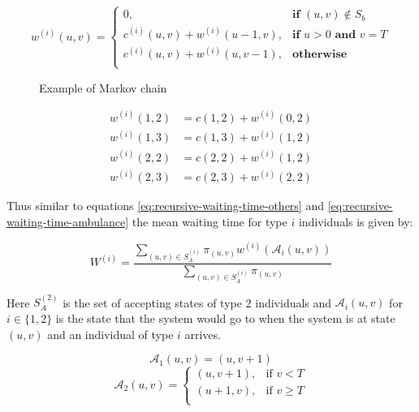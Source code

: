 \begin{equation}
    w^{(i)}(u,v) = 
    \begin{cases} 
        0, & \textbf{if } (u,v) \notin S_b \\
        c^{(i)}(u,v) + w^{(i)}(u - 1, v), & \textbf{if } u > 0 
        \textbf{ and } v = T\\
        c^{(i)}(u,v) + w^{(i)}(u, v-1), & \textbf{otherwise } \\
    \end{cases}
\end{equation}


\begin{multicols*}{2}
    \begin{figure}[H]
        \centering
        \scalebox{0.60}{}
        \caption{Example of Markov chain}
        \label{fig:example-algeb-waiting}
    \end{figure}
    \columnbreak
    \begin{align}
        w^{(i)}(1,2) &= c(1,2) + w^{(i)}(0,2) \label{eq:first_eq_of_waiting_example} \\
        w^{(i)}(1,3) &= c(1,3) + w^{(i)}(1,2) \\
        w^{(i)}(2,2) &= c(2,2) + w^{(i)}(1,2) \\
        w^{(i)}(2,3) &= c(2,3) + w^{(i)}(2,2) \label{eq:last_eq_of_waiting_example}
    \end{align}
\end{multicols*}



Thus similar to equations \ref{eq:recursive-waiting-time-others} and
\ref{eq:recursive-waiting-time-ambulance} the mean waiting time for type \(i\)
individuals is given by:

\begin{equation}
    W^{(i)} = \frac{\sum_{(u,v) \in S_A^{(i)}} \pi_{(u,v)} w^{(i)}
    (\mathcal{A}_i(u,v))}{\sum_{(u,v) \in S_A^{(i)}} \pi_{(u,v)}}
\end{equation}


Here \(S_A^{(2)}\) is the set of accepting states of type 2 individuals and 
\(\mathcal{A}_i(u,v)\) for \(i \in \{1, 2\} \) is the state that the system
would go to when the system is at state \( (u,v) \) and an individual of type
\(i\) arrives. 

\begin{equation}\label{eq:arriving_state_class_1}
    \mathcal{A}_1(u,v) = (u, v + 1)
\end{equation}
\begin{equation}\label{eq:arriving_state_class_2}
    \mathcal{A}_2(u,v) = 
    \begin{cases}
        (u, v + 1), & \text{if } v < T \\
        (u + 1, v), & \text{if } v \geq T \\
    \end{cases}
\end{equation}


